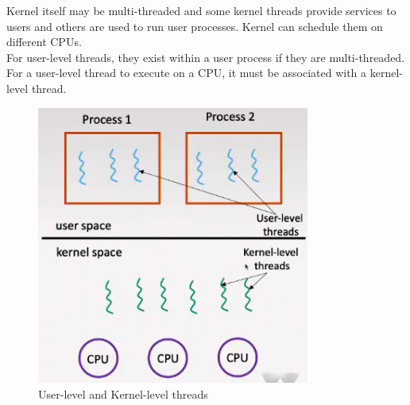 \documentclass[a4paper]{article}
\theoremstyle{plain}
\theoremstyle{definition}
\newtheorem{defn}{Definition}[section]
\theoremstyle{remark}
\begin{document}
\begin{tcolorbox}[colback=black!3!white,colframe=black!60!white,title=\begin{defn}User-level and Kernel level threads \label{User-level and Kernel level threads}\end{defn}]
Kernel itself may be multi-threaded and some kernel threads provide services to users and others are used to run user processes. Kernel can schedule them on different CPUs. \\

For user-level threads, they exist within a user process if they are multi-threaded. For a user-level thread to execute on a CPU, it must be associated with a kernel-level thread.
\begin{figure}[H]
	\centering
	\includegraphics[width=0.8\textwidth]{thirtyone.png}
	\caption{User-level and Kernel-level threads}
	\label{fig:thirtyone-png}
\end{figure}
\end{tcolorbox}
\end{document}
